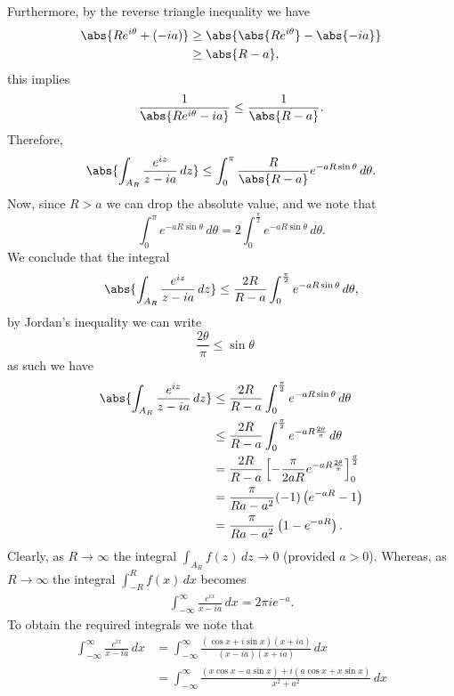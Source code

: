 \documentclass[12pt, a4paper]{article}
\begin{document}
\begin{example}
\begin{solution}
        Furthermore, by the reverse triangle inequality we have
        \[\begin{aligned}
            \abs{Re^{i\theta}+(-ia)} &\geq \abs{\abs{Re^{i\theta}}-\abs{-ia}} \\
            &\geq\abs{R-a},
        \end{aligned}\]
        this implies 
        \[\frac{1}{\abs{Re^{i\theta}-ia}} \leq \frac{1}{\abs{R-a}}.\]
        Therefore,
        \[\abs{\int_{A_R} \frac{e^{iz}}{z-ia} \, dz} \leq \int_{0}^{\pi} \frac{R}{\abs{R-a}} e^{-aR\sin\theta} \, d\theta.\]
        Now, since \(R>a\) we can drop the absolute value, and we note that 
        \[\int_{0}^{\pi} e^{-aR\sin\theta} \, d\theta = 2 \int_{0}^{\frac{\pi}{2}} e^{-aR\sin\theta} \, d\theta.\]
        We conclude that the integral 
        \[\abs{\int_{A_R} \frac{e^{iz}}{z-ia} \, dz} \leq \frac{2R}{R-a} \int_{0}^{\frac{\pi}{2}} e^{-aR\sin\theta} \, d\theta,\]
        by Jordan's inequality we can write 
        \[\frac{2\theta}{\pi} \leq \sin\theta \quad\]
        as such we have 
        \[\begin{aligned}
            \abs{\int_{A_R} \frac{e^{iz}}{z-ia} \, dz} &\leq \frac{2R}{R-a} \int_{0}^{\frac{\pi}{2}} e^{-aR\sin\theta} \, d\theta \\
            &\leq \frac{2R}{R-a} \int_{0}^{\frac{\pi}{2}} e^{-aR \frac{2\theta}{\pi}} \, d\theta \\
            &= \frac{2R}{R-a} \left[ -\frac{\pi}{2aR} e^{-aR \frac{2\theta}{\pi}} \right]_0^{\frac{\pi}{2}} \\
            &= \frac{\pi}{Ra-a^2} (-1) \left( e^{-aR}-1 \right) \\
            &= \frac{\pi}{Ra-a^2}\left( 1-e^{-aR} \right).
        \end{aligned}\]
        Clearly, as \(R\to \infty\) the integral \(\int_{A_R} f(z) \, dz \to 0\) (provided \(a>0\)). Whereas, as \(R\to \infty\) the integral \(\int_{-R}^{R} f(x) \, dx\) becomes 
        \[\begin{aligned}
            \int_{-\infty}^{\infty} \frac{e^{ix}}{x-ia} \, dx = 2\pi i e^{-a}.
        \end{aligned}\]
        To obtain the required integrals we note that 
        \[\begin{aligned}
            \int_{-\infty}^{\infty} \frac{e^{ix}}{x-ia} \, dx &= \int_{-\infty}^{\infty} \frac{(\cos x+i\sin x)(x+ia)}{(x-ia)(x+ia)} \, dx \\
            &= \int_{-\infty}^{\infty} \frac{(x\cos x -a\sin x)+i(a\cos x+x\sin x)}{x^2+a^2} \, dx \\

\end{aligned}\]
\end{solution}
\end{example}
\end{document}

